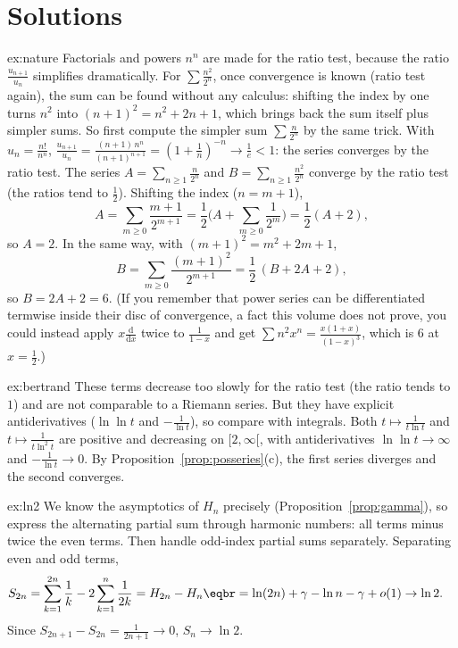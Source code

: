\section{Solutions}
\begin{solution}{ex:nature}
\idea Factorials and powers $n^n$ are made for the ratio test, because the ratio $\frac{u_{n+1}}{u_n}$ simplifies dramatically. For $\sum\frac{n^2}{2^n}$, once convergence is known (ratio test again), the sum can be found without any calculus: shifting the index by one turns $n^2$ into $(n+1)^2=n^2+2n+1$, which brings back the sum itself plus simpler sums. So first compute the simpler sum $\sum\frac n{2^n}$ by the same trick.
\writeup With $u_n=\frac{n!}{n^n}$, $\frac{u_{n+1}}{u_n}=\frac{(n+1)\,n^n}{(n+1)^{n+1}}=\left(1+\frac1n\right)^{-n}\to\frac1e<1$: the series converges by the ratio test.
The series $A=\sum_{n\ge1}\frac n{2^n}$ and $B=\sum_{n\ge1}\frac{n^2}{2^n}$ converge by the ratio test (the ratios tend to $\frac12$). Shifting the index ($n=m+1$),
\[A=\sum_{m\ge0}\frac{m+1}{2^{m+1}}=\frac12\Big(A+\sum_{m\ge0}\frac1{2^m}\Big)=\frac12(A+2),\]
so $A=2$. In the same way, with $(m+1)^2=m^2+2m+1$,
\[B=\sum_{m\ge0}\frac{(m+1)^2}{2^{m+1}}=\frac12\,(B+2A+2),\]
so $B=2A+2=6$. (If you remember that power series can be differentiated termwise inside their disc of convergence, a fact this volume does not prove, you could instead apply $x\frac{\mathrm d}{\mathrm dx}$ twice to $\frac1{1-x}$ and get $\sum n^2x^n=\frac{x(1+x)}{(1-x)^3}$, which is $6$ at $x=\frac12$.)
\end{solution}

\begin{solution}{ex:bertrand}
\idea These terms decrease too slowly for the ratio test (the ratio tends to $1$) and are not comparable to a Riemann series. But they have explicit antiderivatives ($\ln\ln t$ and $-\frac1{\ln t}$), so compare with integrals.
\writeup Both $t\mapsto\frac1{t\ln t}$ and $t\mapsto\frac1{t\ln^2t}$ are positive and decreasing on $[2,\infty[$, with antiderivatives $\ln\ln t\to\infty$ and
$-\frac1{\ln t}\to0$. By Proposition~\ref{prop:posseries}(c), the first series diverges and the second converges.
\end{solution}

\begin{solution}{ex:ln2}
\idea We know the asymptotics of $H_n$ precisely (Proposition~\ref{prop:gamma}), so express the alternating partial sum through harmonic numbers: all terms minus twice the even terms. Then handle odd-index partial sums separately.
\writeup Separating even and odd terms,
\[
\begin{aligned}S_{2n}&=\sum_{k=1}^{2n}\frac1k-2\sum_{k=1}^n\frac1{2k}=H_{2n}-H_n\eqbr=\ln(2n)+\gamma-\ln n-\gamma+o(1)\to\ln2.\end{aligned}
\]
Since $S_{2n+1}-S_{2n}=\frac1{2n+1}\to0$, $S_n\to\ln2$.
\end{solution}


